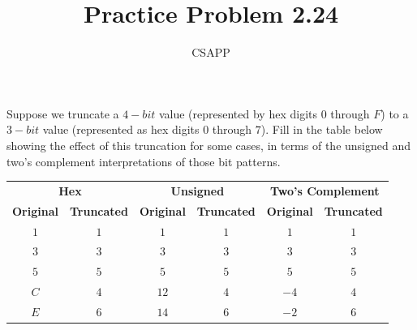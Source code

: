 \documentclass{article}
\title{Practice Problem 2.24}
\author{CSAPP}
\begin{document}
    \maketitle
    \begin{flushleft}
        Suppose we truncate a $4-bit$ value (represented by hex digits $0$ through $F$)
        to a $3-bit$ value (represented as hex digits $0$ through $7$). Fill in the table
        below showing the effect of this truncation for some cases, in terms of the 
        unsigned and two's complement interpretations of those bit patterns.
    \small  
    \begin{tabular}{cc|cc|cc}
        \toprule
        \multicolumn{2}{c|}{\textbf{Hex}} & \multicolumn{2}{c|}{\textbf{Unsigned}} & \multicolumn{2}{c}{\textbf{Two's Complement}} \\
        \textbf{Original} & \textbf{Truncated} & \textbf{Original} & \textbf{Truncated} & \textbf{Original} & \textbf{Truncated} \\
        \midrule
        $1$ &  $1$ & $1$  & $1$    & $1$  & $1$\\
        $3$ &  $3$ & $3$  & $3$    & $3$  & $3$\\
        $5$ &  $5$ & $5$  & $5$    & $5$  & $5$\\
        $C$ &  $4$ & $12$ & $4$   & $-4$ & $4$\\
        $E$ &  $6$ & $14$ & $6$   & $-2$ & $6$\\
        \bottomrule
\end{tabular}
    \end{flushleft}
\end{document}
